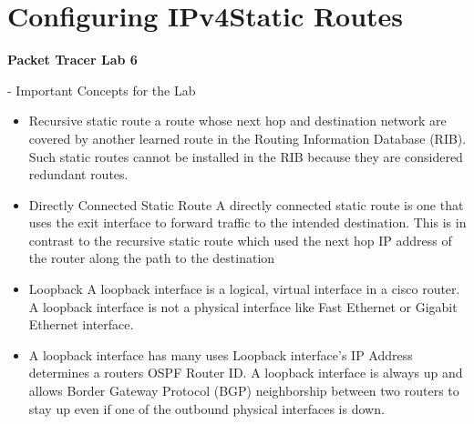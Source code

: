 \documentclass[../EngineeringJournal_CDavis.tex]{subfiles}
\begin{document}

\chapter[Configuring IPv4 Static]{Configuring IPv4\linebreak[1] Static Routes \hspace*{\fill}{Feb 8, 2020}}
\noindent\textbf{{Packet Tracer Lab 6} }                             

\hspace{0.2cm}
\begin{tcolorbox}[width=6.3in]
\scriptsize 
- Important Concepts for the Lab
  \begin{itemize}
    \item{Recursive static route}
      \subitem{}a route whose next hop and destination network 
	are covered by another learned route in the 
	Routing Information Database (RIB).
      \subitem{} Such static routes cannot be installed in the 
	  RIB because they are considered redundant routes. 
    \item{Directly Connected Static Route}     
      \subitem{} A directly connected static route is one that 
      uses the exit interface to forward traffic to the 
      intended destination.
        \subitem{} This is in contrast to the recursive static route
	which used the next hop IP address of the router 
	along the path to the destination
    \item{Loopback} 
        \subitem{} A loopback interface is a logical, virtual interface in 
	a cisco router.
	\subitem{} A loopback interface is not a physical interface like 
	  Fast Ethernet or Gigabit Ethernet interface. 
    \item{A loopback interface has many uses}
        \subitem{} Loopback interface's  IP Address determines a routers OSPF
	Router ID.
	\subitem{} A loopback interface is always up and allows Border
	  Gateway Protocol (BGP) neighborship between two routers to stay
	  up even if one of the outbound physical interfaces is down.
  \end{itemize}
\end{tcolorbox}
\hspace{0.2cm}
\normalsize  
\end{document}
